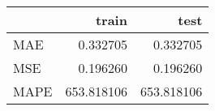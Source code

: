 \begin{tabular}{lrr}
\toprule
{} &       train &        test \\
\midrule
MAE  &    0.332705 &    0.332705 \\
MSE  &    0.196260 &    0.196260 \\
MAPE &  653.818106 &  653.818106 \\
\bottomrule
\end{tabular}
